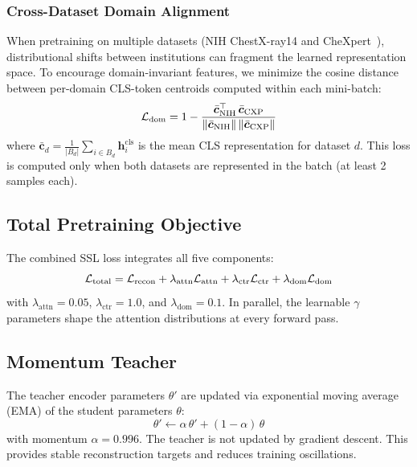 \subsubsection{Cross-Dataset Domain Alignment}
\label{sec:domain_align}

When pretraining on multiple datasets (NIH ChestX-ray14 and CheXpert~\cite{irvin2019chexpert}), distributional shifts between institutions can fragment the learned representation space. To encourage domain-invariant features, we minimize the cosine distance between per-domain CLS-token centroids computed within each mini-batch:
\begin{equation}
\mathcal{L}_{\mathrm{dom}} = 1 - \frac{\bar{\bm{c}}_{\text{NIH}}^\top \, \bar{\bm{c}}_{\text{CXP}}}{\|\bar{\bm{c}}_{\text{NIH}}\| \, \|\bar{\bm{c}}_{\text{CXP}}\|}
\label{eq:domain}
\end{equation}
where $\bar{\bm{c}}_d = \frac{1}{|B_d|} \sum_{i \in B_d} \bm{h}_i^{\text{cls}}$ is the mean CLS representation for dataset $d$. This loss is computed only when both datasets are represented in the batch (at least 2 samples each).

\subsection{Total Pretraining Objective}
\label{sec:total_loss}

The combined SSL loss integrates all five components:
\begin{equation}
\mathcal{L}_{\mathrm{total}} = \mathcal{L}_{\mathrm{recon}} + \lambda_{\text{attn}} \mathcal{L}_{\mathrm{attn}} + \lambda_{\text{ctr}} \mathcal{L}_{\mathrm{ctr}} + \lambda_{\text{dom}} \mathcal{L}_{\mathrm{dom}}
\label{eq:total}
\end{equation}
with $\lambda_{\text{attn}} = 0.05$, $\lambda_{\text{ctr}} = 1.0$, and $\lambda_{\text{dom}} = 0.1$. In parallel, the learnable $\gamma$ parameters shape the attention distributions at every forward pass.

\subsection{Momentum Teacher}
\label{sec:momentum}

The teacher encoder parameters $\theta'$ are updated via exponential moving average (EMA) of the student parameters $\theta$:
\begin{equation}
\theta' \leftarrow \alpha \, \theta' + (1 - \alpha) \, \theta
\label{eq:ema}
\end{equation}
with momentum $\alpha = 0.996$. The teacher is not updated by gradient descent. This provides stable reconstruction targets and reduces training oscillations.


